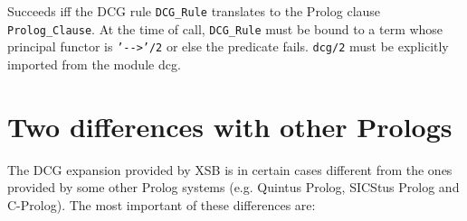 \begin{description}
    Succeeds iff the DCG rule {\tt DCG\_Rule} translates to the Prolog
    clause {\tt Prolog\_Clause}.  At the time of call, {\tt DCG\_Rule}
    must be bound to a term whose principal functor is {\tt '\verb|-->|'/2}
    or else the predicate fails.  {\tt dcg/2} must be explicitly
    imported from the module {\sf dcg}.

\end{description}


\section{Two differences with other Prologs}\label{sec-dcg-differences}
The DCG expansion provided by XSB is in certain cases different 
from the ones provided by some other Prolog systems (e.g.  Quintus Prolog, 
SICStus Prolog and C-Prolog). The most important of these differences are:
